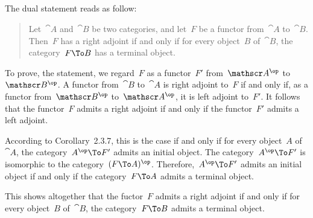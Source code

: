 \subsection{}

The dual statement reads as follow:
\begin{quote}
	Let~$\cat{A}$ and~$\cat{B}$ be two categories, and let~$F$ be a functor from~$\cat{A}$ to~$\cat{B}$.
	Then~$F$ has a right adjoint if and only if for every object~$B$ of~$\cat{B}$, the category~$F \To B$ has a terminal object.
\end{quote}

To prove, the statement, we regard~$F$ as a functor~$F'$ from~$\cat{A}^{\op}$ to~$\cat{B}^{\op}$.
A functor from~$\cat{B}$ to~$\cat{A}$ is right adjoint to~$F$ if and only if, as a functor from~$\cat{B}^{\op}$ to~$\cat{A}^{\op}$, it is left adjoint to~$F'$.
It follows that the functor~$F$ admits a right adjoint if and only if the functor~$F'$ admits a left adjoint.

According to Corollary~2.3.7, this is the case if and only if for every object~$A$ of~$\cat{A}$, the category~$A^{\op} \To F'$ admits an initial object.
The category~$A^{\op} \To F'$ is isomorphic to the category~$(F \To A)^{\op}$.
Therefore,~$A^{\op} \To F'$ admits an initial object if and only if the category~$F \To A$ admits a terminal object.

This shows altogether that the fuctor~$F$ admits a right adjoint if and only if for every object~$B$ of~$\cat{B}$, the category~$F \To B$ admits a terminal object.
